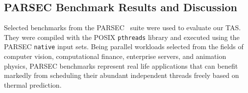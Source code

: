 \documentclass[times, 10pt,twocolumn]{IEEEtran}
\begin{document}
\subsection{PARSEC Benchmark Results and Discussion}
\label{sec:mult-behav} 
Selected benchmarks from the PARSEC~\cite{Bienia2011} suite were used to
evaluate our TAS.  They were compiled with the POSIX \texttt{pthreads}
library and executed using the PARSEC \texttt{native} input sets.  Being
parallel workloads selected from the fields of computer vision,
computational finance, enterprise servers, and animation physics, PARSEC
benchmarks represent real life applications that can benefit markedly
from scheduling their abundant independent threads freely based on
thermal prediction.
\end{document}
